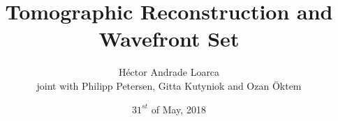 \title[Tomographic Reconstruction and Wavefront Set]{Tomographic Reconstruction and Wavefront Set}
\author{H\'ector Andrade Loarca\\
				\scriptsize{joint with Philipp Petersen, Gitta Kutyniok and Ozan \"Oktem}}
\date{$31^{st}$ of May, 2018}


\newcommand{\mylogo}{\texttt{[image: ./Images/AFG.pdf]}}

\begin{frame}[plain]
	\titlepage
\end{frame}

